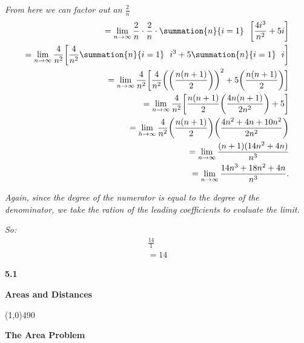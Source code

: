 \documentclass{report}
\begin{document}
\bigbreak \noindent 
\textit{From here we can factor out an $\frac{2}{n}$}
\begin{align*}
  =\lim_{n \to \infty}{\frac{2}{n} \cdot \frac{2}{n} \cdot \summation{n}{i=1}\ \ \bigg[\frac{4i^{3}}{n^{2}} + 5i \bigg]}\\
  =\lim_{n \to \infty}{\frac{4}{n^{2}} \bigg[\frac{4}{n^{2}} \summation{n}{i=1}\ \ i^{3} + 5\summation{n}{i=1}\ \ i \bigg]} \\
  = \lim_{n \to \infty}{ \frac{4}{n^{2}}\bigg[\frac{4}{n^{2}}\bigg(\bigg(\frac{n(n+1)}{2}\bigg)\bigg)^{2} + 5\bigg(\frac{n(n+1)}{2}\bigg)\bigg]} \\
  = \lim_{n \to \infty}{\frac{4}{n^{2}}\bigg[\frac{n(n+1)}{2}\bigg(\frac{4n(n+1)}{2n^{2}}\bigg)+5\bigg]} \\
  = \lim_{h \to \infty}{\frac{4}{n^{2}}\bigg(\frac{n(n+1)}{2}\bigg)\bigg(\frac{4n^{2}+4n+10n^{2}}{2n^{2}}\bigg)} \\
  = \lim_{n \to \infty}{\frac{(n+1)(14n^{2}+4n)}{n^{3}}} \\
  = \lim_{n \to \infty}{\frac{14n^{3}+18n^{2} + 4n}{n^{3}}}
.\end{align*}

\bigbreak \noindent 
\textit{Again, since the degree of the numerator is equal to the degree of the denominator, we 
  take the ration of the leading coefficients to evaluate the limit.
}

\bigbreak \noindent
\textit{So:}
\begin{align*}
  \frac{14}{1} \\
  \boxed{=14}
\end{align*}

\pagebreak \bigbreak \noindent
\begin{Large}
  \begin{mdframed}
    \begin{center}
      \textbf{5.1}
    \end{center}
  \end{mdframed}
\end{Large}
\begin{Large}
  \begin{center}
    \textbf{Areas and Distances}
  \end{center}
\end{Large}
\line(1,0){490}

\bigbreak \noindent \bigbreak \noindent 
\begin{large}
  \textbf{The Area Problem}
\end{large}
\end{document}
